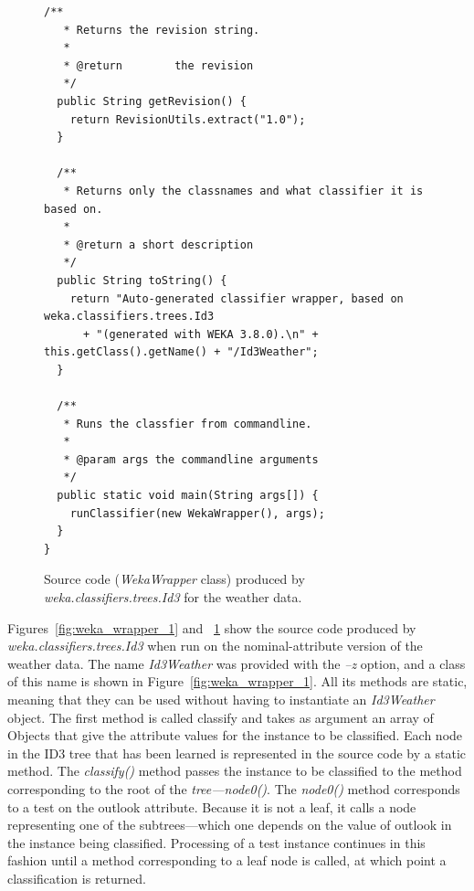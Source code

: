 \begin{figure}[!thp]
\ContinuedFloat
\begin{mdframed}[innermargin=-1cm]
\begin{Verbatim}[fontsize=\scriptsize]
/**
   * Returns the revision string.
   * 
   * @return        the revision
   */
  public String getRevision() {
    return RevisionUtils.extract("1.0");
  }

  /**
   * Returns only the classnames and what classifier it is based on.
   *
   * @return a short description
   */
  public String toString() {
    return "Auto-generated classifier wrapper, based on weka.classifiers.trees.Id3 
      + "(generated with WEKA 3.8.0).\n" + this.getClass().getName() + "/Id3Weather";
  }

  /**
   * Runs the classfier from commandline.
   *
   * @param args the commandline arguments
   */
  public static void main(String args[]) {
    runClassifier(new WekaWrapper(), args);
  }
}

\end{Verbatim}
\end{mdframed}
\caption{\label{fig:weka_wrapper_2}Source code (\textit{WekaWrapper} class) produced by \textit{weka.classifiers.trees.Id3} for the weather data.}
\end{figure}

Figures~\ref{fig:weka_wrapper_1} and ~\ref{fig:weka_wrapper_2} show
the source code produced by \textit{weka.classifiers.trees.Id3} when run on the
nominal-attribute version of the weather data. The name \textit{Id3Weather} was
provided with the \textit{--z} option, and a class of this name is shown in
Figure~\ref{fig:weka_wrapper_1}. All its methods are static, meaning that they can be used
without having to instantiate an \textit{Id3Weather} object. The first method
is called classify and takes as argument an array of Objects that give
the attribute values for the instance to be classified. Each node in
the ID3 tree that has been learned is represented in the source code
by a static method. The \textit{classify()} method passes the instance to be
classified to the method corresponding to the root of the
\textit{tree—node0()}. The \textit{node0()} method corresponds to a test on the outlook
attribute. Because it is not a leaf, it calls a node representing one
of the subtrees---which one depends on the value of outlook in the
instance being classified. Processing of a test instance continues in
this fashion until a method corresponding to a leaf node is called, at
which point a classification is returned.

